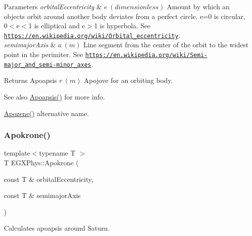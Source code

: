 \begin{DoxyParams}{Parameters}
{\em orbital\+Eccentricity} & $ e\ (dimensionless)$ Amount by which an objects orbit around another body deviates from a perfect circle. e=0 is circular, 0$<$e$<$1 is elliptical and e$>$1 is hyperbola. See \href{https://en.wikipedia.org/wiki/Orbital_eccentricity}{\tt https\+://en.\+wikipedia.\+org/wiki/\+Orbital\+\_\+eccentricity}. \\
\hline
{\em semimajor\+Axis} & $ a\ (m)$ Line segment from the center of the orbit to the widest point in the perimiter. See \href{https://en.wikipedia.org/wiki/Semi-major_and_semi-minor_axes}{\tt https\+://en.\+wikipedia.\+org/wiki/\+Semi-\/major\+\_\+and\+\_\+semi-\/minor\+\_\+axes}. \\
\hline
\end{DoxyParams}
\begin{DoxyReturn}{Returns}
Apoapsis $ r\ (m)$ Apojove for an orbiting body. 
\end{DoxyReturn}
\begin{DoxySeeAlso}{See also}
\mbox{\hyperlink{group___e_g_x_phys-_apoapsis_gaf962e650bf84a568458e8eb39b1c61ba}{Apoapsis()}} for more info. 

\mbox{\hyperlink{group___e_g_x_phys-_apoapsis_ga44d3dd8d8b350d053b25b7b1f1e15534}{Apozene()}} alternative name. 
\end{DoxySeeAlso}
\mbox{\label{group___e_g_x_phys-_apoapsis_ga98557a8d49aa129c29e652c4758334d1}} 
\subsubsection{\texorpdfstring{Apokrone()}{Apokrone()}}
{\footnotesize\ttfamily template$<$typename T $>$ \\
T E\+G\+X\+Phys\+::\+Apokrone (\begin{DoxyParamCaption}\item[{const T \&}]{orbital\+Eccentricity,  }\item[{const T \&}]{semimajor\+Axis }\end{DoxyParamCaption})}



Calculates apoapsis around Saturn. 


